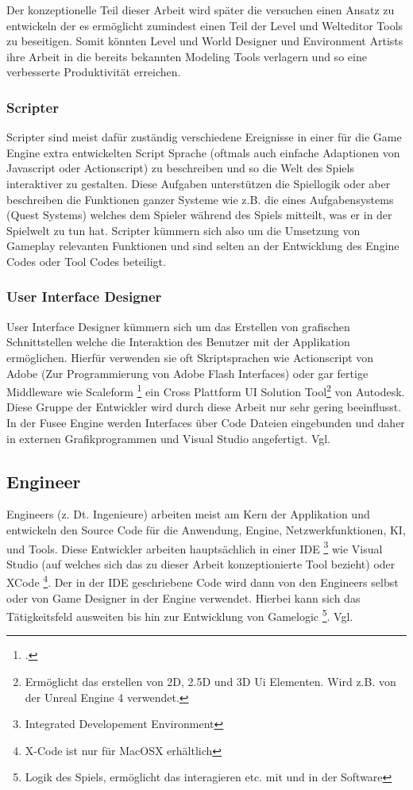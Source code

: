 \documentclass[pagesize, paper=a4, fontsize=12pt, titlepage=true, headings=small, headnosepline, abstractoff, liststotoc, nochapterprefix, plainheadsepline, twoside]{scrreprt}
\begin{document}
Der konzeptionelle Teil dieser Arbeit wird später die versuchen einen Ansatz zu entwickeln der es ermöglicht zumindest einen Teil der Level und Welteditor Tools zu beseitigen. Somit könnten Level und World Designer und Environment Artists ihre Arbeit in die bereits bekannten Modeling Tools verlagern und so eine verbesserte Produktivität erreichen.

\subsubsection{Scripter}
Scripter sind meist dafür zuständig verschiedene Ereignisse in einer für die Game Engine extra entwickelten Script Sprache (oftmals auch einfache Adaptionen von Javascript oder Actionscript) zu beschreiben und so die Welt des Spiels interaktiver zu gestalten. Diese Aufgaben unterstützen die Spiellogik oder aber beschreiben die Funktionen ganzer Systeme wie z.B. die eines Aufgabensystems (Quest Systems) welches dem Spieler während des Spiels mitteilt, was er in der Spielwelt zu tun hat. Scripter kümmern sich also um die Umsetzung von Gameplay relevanten Funktionen und sind selten an der Entwicklung des Engine Codes oder Tool Codes beteiligt.

\subsubsection{User Interface Designer}
User Interface Designer kümmern sich um das Erstellen von grafischen Schnittstellen welche die Interaktion des Benutzer mit der Applikation ermöglichen. Hierfür verwenden sie oft Skriptsprachen wie Actionscript von Adobe (Zur Programmierung von Adobe Flash Interfaces) oder gar fertige Middleware wie Scaleform \footcite{AutodeskScale2014} ein Cross Plattform UI Solution Tool\footnote{Ermöglicht das erstellen von 2D, 2.5D und 3D Ui Elementen. Wird z.B. von der Unreal Engine 4 verwendet.} von Autodesk. Diese Gruppe der Entwickler wird durch diese Arbeit nur sehr gering beeinflusst. In der Fusee Engine werden Interfaces über Code Dateien eingebunden und daher in externen Grafikprogrammen und Visual Studio angefertigt. Vgl. \parencite[S. 31]{Chandler2006}

\subsection{Engineer}
Engineers (z. Dt. Ingenieure) arbeiten meist am Kern der Applikation und entwickeln den Source Code für die Anwendung, Engine, Netzwerkfunktionen, KI, und Tools. Diese Entwickler arbeiten hauptsächlich in einer IDE \footnote{Integrated Developement Environment} wie Visual Studio (auf welches sich das zu dieser Arbeit konzeptionierte Tool bezieht) oder XCode \footnote{X-Code ist nur für MacOSX erhältlich}. Der in der IDE geschriebene Code wird dann von den Engineers selbst oder von Game Designer in der Engine verwendet. Hierbei kann sich das Tätigkeitsfeld ausweiten bis hin zur Entwicklung von Gamelogic \footnote{Logik des Spiels, ermöglicht das interagieren etc. mit und in der Software}. Vgl. \parencite[S. 26]{Chandler2006}
\end{document}

